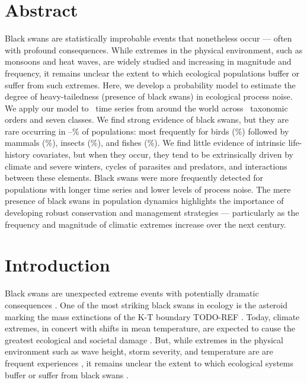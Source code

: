 

\section{Abstract}

Black swans are statistically improbable events that nonetheless occur ---
often with profound consequences. While extremes in the physical environment,
such as monsoons and heat waves, are widely studied and increasing in magnitude
and frequency, it remains unclear the extent to which ecological populations
buffer or suffer from such extremes. Here, we develop a probability model to
estimate the degree of heavy-tailedness (presence of black swans) in ecological
process noise. We apply our model to \NPops~time series from around the world
across \NOrders~taxonomic orders and seven classes. We find strong evidence of
black swans, but they are rare occurring in
\overallMinPerc--\overallMaxPerc\% of populations: most frequently for birds
(\AvesRangePerc\%) followed by mammals (\MammaliaRangePerc\%), insects
(\InsectaRangePerc\%), and fishes (\OsteichthyesRangePerc\%). We find little
evidence of intrinsic life-history covariates, but when they occur, they tend
to be extrinsically driven by climate and severe winters, cycles of parasites
and predators, and interactions between these elements. Black swans were more
frequently detected for populations with longer time series and lower levels of
process noise. The mere presence of black swans in population dynamics
highlights the importance of developing robust conservation and management
strategies --- particularly as the frequency and magnitude of climatic extremes
increase over the next century.

\section{Introduction}

Black swans are unexpected extreme events with potentially dramatic
consequences \citep{taleb2007,sornette2009}. One of the most striking black
swans in ecology is the asteroid marking the mass extinctions of the K-T
boundary TODO-REF \citep{harnik2012}. Today, climate extremes, in concert with
shifts in mean temperature, are expected to cause the greatest ecological and
societal damage \citep{ipcc2012}. But, while extremes in the physical
environment such as wave height, storm severity, and temperature are are
frequent experiences \citep{gaines1993,katz2005}, it remains unclear the extent
to which ecological systems buffer or suffer from black swans
\citep{nunez2012}.

